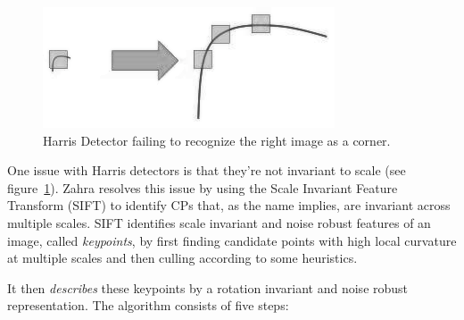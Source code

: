 \begin{figure}
	\centering
	\includegraphics[width=\linewidth,keepaspectratio]{figures/registration/sift/sift_scale_invariant.png}
	\caption{Harris Detector failing to recognize the right image as a corner.}
	\label{fig:sift_harris}
\end{figure}
One issue with Harris detectors is that they're not invariant to scale (see figure~\ref{fig:sift_harris}).
%
Zahra \etal \cite{zahrasift} resolves this issue by using the Scale Invariant Feature Transform \cite{lowe2004distinctive} (SIFT) to identify CPs that, as the name implies, are invariant across multiple scales.
%
SIFT identifies scale invariant and noise robust features of an image, called \textit{keypoints}, by first finding candidate points with high local curvature at multiple scales and then culling according to some heuristics.

%
It then \textit{describes} these keypoints by a rotation invariant and noise robust representation.
%
The algorithm consists of five steps:
%

